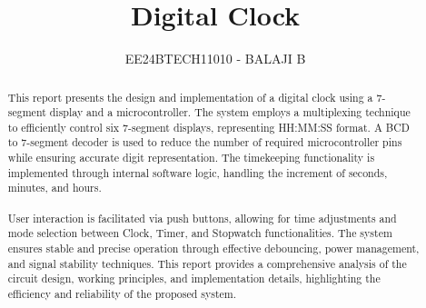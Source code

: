\documentclass[journal]{IEEEtran}
\begin{document}

\vspace{3cm}

\title{Digital Clock}
\author{EE24BTECH11010 - BALAJI B}
{\let\newpage\relax\maketitle}

\renewcommand{\thefigure}{\theenumi}
\renewcommand{\thetable}{\theenumi}
\setlength{\intextsep}{10pt} %
\renewcommand{\thetable}{\theenumi}


\begin{abstract}
    This report presents the design and implementation of a digital clock using a 7-segment display and a microcontroller. The system employs a multiplexing technique to efficiently control six 7-segment displays, representing HH:MM:SS format. A BCD to 7-segment decoder is used to reduce the number of required microcontroller pins while ensuring accurate digit representation. The timekeeping functionality is implemented through internal software logic, handling the increment of seconds, minutes, and hours. \\ \\
    User interaction is facilitated via push buttons, allowing for time adjustments and mode selection between Clock, Timer, and Stopwatch functionalities. The system ensures stable and precise operation through effective debouncing, power management, and signal stability techniques. This report provides a comprehensive analysis of the circuit design, working principles, and implementation details, highlighting the efficiency and reliability of the proposed system.
\end{abstract}

\tableofcontents
\end{document}
